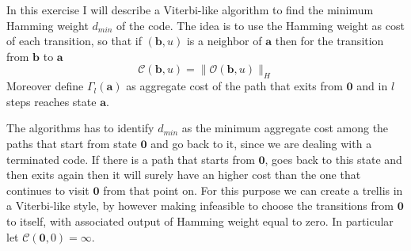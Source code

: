\documentclass[10pt]{article}
\newcommand{\outf}[1] {\mathcal{O}(#1)}
\begin{document}
In this exercise I will describe a Viterbi-like algorithm to find the minimum Hamming weight $d_{min}$ of the code. The idea is to use the Hamming weight as cost of each transition, so that if $(\mathbf{b}, u)$ is a neighbor of $\mathbf{a}$ then for the transition from $\mathbf{b}$ to $\mathbf{a}$
\begin{equation}
	\mathcal{C}(\mathbf{b}, u) = \|\outf{\mathbf{b}, u}\|_H
\end{equation}
Moreover define $\Gamma_l(\mathbf{a})$ as aggregate cost of the path that exits from $\mathbf{0}$ and in $l$ steps reaches state $\mathbf{a}$.

The algorithms has to identify $d_{min}$ as the minimum aggregate cost among the paths that start from state $\mathbf{0}$ and go back to it, since we are dealing with a terminated code. If there is a path that starts from $\mathbf{0}$, goes back to this state and then exits again then it will surely have an higher cost than the one that continues to visit $\mathbf{0}$ from that point on. For this purpose we can create a trellis in a Viterbi-like style, by however making infeasible to choose the transitions from $\mathbf{0}$ to itself, with associated output of Hamming weight equal to zero. In particular let $\mathcal{C}(\mathbf{0}, 0) = \infty$.
\end{document}
